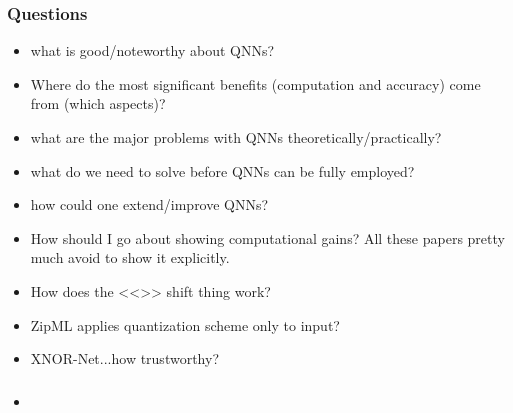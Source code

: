 \documentclass{article}
\begin{document}
\subsubsection*{Questions}
\begin{itemize}

    \item what is good/noteworthy about QNNs?
    \item Where do the most significant benefits (computation and accuracy) come from (which aspects)?
    \item what are the major problems with QNNs theoretically/practically?
    \item what do we need to solve before QNNs can be fully employed?
    \item how could one extend/improve QNNs?
    \item How should I go about showing computational gains? All these papers pretty
    much avoid to show it explicitly.
    \item How does the <<>> shift thing work?
    \item ZipML applies quantization scheme only to input?
    \item XNOR-Net...how trustworthy?
\end{itemize}

\subsubsection*{}
\begin{itemize}
    \item 
\end{itemize}
\end{document}
